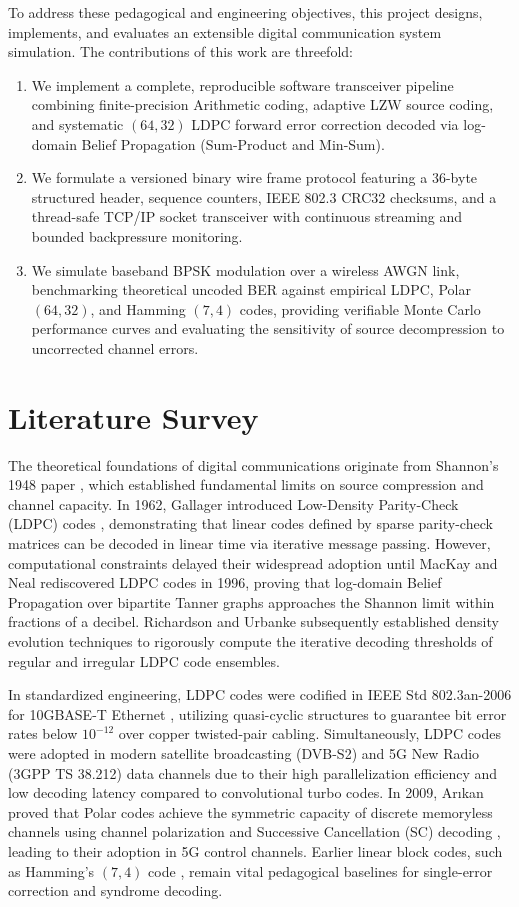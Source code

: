 \documentclass[conference]{IEEEtran}
\begin{document}
To address these pedagogical and engineering objectives, this project designs, implements, and evaluates an extensible digital communication system simulation. The contributions of this work are threefold:
\begin{enumerate}
    \item We implement a complete, reproducible software transceiver pipeline combining finite-precision Arithmetic coding, adaptive LZW source coding, and systematic $(64, 32)$ LDPC forward error correction decoded via log-domain Belief Propagation (Sum-Product and Min-Sum).
    \item We formulate a versioned binary wire frame protocol featuring a 36-byte structured header, sequence counters, IEEE 802.3 CRC32 checksums, and a thread-safe TCP/IP socket transceiver with continuous streaming and bounded backpressure monitoring.
    \item We simulate baseband BPSK modulation over a wireless AWGN link, benchmarking theoretical uncoded BER against empirical LDPC, Polar $(64, 32)$, and Hamming $(7, 4)$ codes, providing verifiable Monte Carlo performance curves and evaluating the sensitivity of source decompression to uncorrected channel errors.
\end{enumerate}

\section{Literature Survey}
The theoretical foundations of digital communications originate from Shannon's 1948 paper \cite{shannon1948}, which established fundamental limits on source compression and channel capacity. In 1962, Gallager introduced Low-Density Parity-Check (LDPC) codes \cite{gallager1962}, demonstrating that linear codes defined by sparse parity-check matrices can be decoded in linear time via iterative message passing. However, computational constraints delayed their widespread adoption until MacKay and Neal \cite{mackay1996} rediscovered LDPC codes in 1996, proving that log-domain Belief Propagation over bipartite Tanner graphs approaches the Shannon limit within fractions of a decibel. Richardson and Urbanke \cite{richardson2001} subsequently established density evolution techniques to rigorously compute the iterative decoding thresholds of regular and irregular LDPC code ensembles.

In standardized engineering, LDPC codes were codified in IEEE Std 802.3an-2006 for 10GBASE-T Ethernet \cite{ieee8023an2006}, utilizing quasi-cyclic structures to guarantee bit error rates below $10^{-12}$ over copper twisted-pair cabling. Simultaneously, LDPC codes were adopted in modern satellite broadcasting (DVB-S2) and 5G New Radio (3GPP TS 38.212) data channels due to their high parallelization efficiency and low decoding latency compared to convolutional turbo codes. In 2009, Ar{\i}kan proved that Polar codes achieve the symmetric capacity of discrete memoryless channels using channel polarization and Successive Cancellation (SC) decoding \cite{arikan2009}, leading to their adoption in 5G control channels. Earlier linear block codes, such as Hamming's $(7, 4)$ code \cite{hamming1950}, remain vital pedagogical baselines for single-error correction and syndrome decoding.
\end{document}
